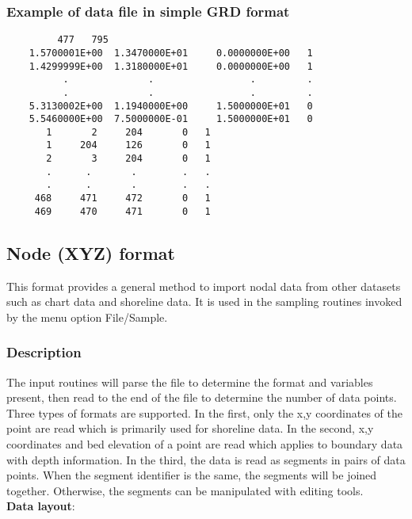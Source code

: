 \documentclass{article}
\begin{document}
\subsubsection{Example of data file in simple GRD format}

\begin{small}
\begin{lstlisting}
         477   795
    1.5700001E+00  1.3470000E+01     0.0000000E+00   1  
    1.4299999E+00  1.3180000E+01     0.0000000E+00   1  
          .              .                 .         .
          .              .                 .         .
    5.3130002E+00  1.1940000E+00     1.5000000E+01   0  
    5.5460000E+00  7.5000000E-01     1.5000000E+01   0  
       1       2     204       0   1
       1     204     126       0   1
       2       3     204       0   1
       .      .       .        .   .
       .      .       .        .   .
     468     471     472       0   1
     469     470     471       0   1
\end{lstlisting}
\end{small}

\newpage
\subsection[Node (XYZ) format]{Node (XYZ) format}

This format provides a general method to import nodal data from other datasets such as chart data and shoreline data.
It is used in the sampling routines invoked by the menu option File/Sample.

\subsubsection[Description]{Description}

The input routines will parse the file to 
determine the format and variables present, then read to the end of the file to determine the number of data points. 
Three types of formats are supported. In the first, only the x,y coordinates of the point are read which is primarily used
for shoreline data.  In the second,  x,y coordinates and bed elevation of a point are read which applies to boundary data with
depth information. In the third, the data is read as segments in pairs of data points. When the segment identifier is the same,
the segments will be joined together. Otherwise, the segments can be manipulated with editing tools.\\

\textbf{Data layout}: \\ 
\end{document}
